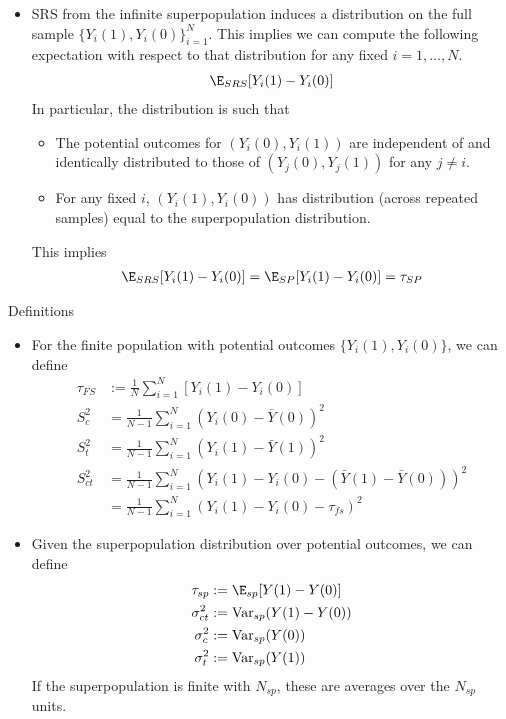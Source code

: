 \documentclass[12pt]{article}
\theoremstyle{plain}
\theoremstyle{definition}
\theoremstyle{remark}
\newcommand{\Var}{\operatorname{Var}}
\newcommand{\sumiN}{\sum^N_{i=1}}
\begin{document}
\begin{itemize}
\begin{itemize}
      \item
        SRS from the infinite superpopulation induces a distribution on
        the full sample $\{Y_i(1),Y_i(0)\}_{i=1}^N$.
        This implies we can compute the following expectation with
        respect to that distribution for any fixed $i=1,\ldots,N$.
        \begin{align*}
          \E_{SRS}[Y_i(1)-Y_i(0)]
        \end{align*}
        In particular, the distribution is such that
        \begin{itemize}
          \item
            The potential outcomes for
            $(Y_i(0),Y_i(1))$
            are independent of and identically distributed to those of
            $(Y_j(0),Y_j(1))$
            for any $j\neq i$.
          \item For any fixed $i$, $(Y_i(1),Y_i(0))$ has distribution
            (across repeated samples) equal to the superpopulation
            distribution.
        \end{itemize}
        This implies
        \begin{align*}
          \E_{SRS}[Y_i(1)-Y_i(0)]
          =
          \E_{SP}[Y_i(1)-Y_i(0)]
          =
          \tau_{SP}
        \end{align*}
    \end{itemize}
\end{itemize}
Definitions
\begin{itemize}
  \item
    For the finite population with potential outcomes
    $\{Y_i(1),Y_i(0)\}$, we can define
    \begin{align*}
      \tau_{FS}
      &:=
      \frac{1}{N}
      \sumiN
      [Y_i(1)-Y_i(0)]
      \\
      S_c^2
      &=
      \frac{1}{N-1}
      \sumiN
      (Y_i(0)-\bar{Y}(0))^2
      \\
      S_t^2
      &=
      \frac{1}{N-1}
      \sumiN
      (Y_i(1)-\bar{Y}(1))^2
      \\
      S_{ct}^2
      &=
      \frac{1}{N-1}
      \sumiN
      (Y_i(1)-Y_i(0)-(\bar{Y}(1)-\bar{Y}(0)))^2
      \\
      &=
      \frac{1}{N-1}
      \sumiN
      (Y_i(1)-Y_i(0)-\tau_{fs})^2
    \end{align*}

  \item
    Given the superpopulation distribution over potential outcomes, we
    can define
    \begin{align*}
      \tau_{sp}
      &:=
      \E_{sp}[Y(1)-Y(0)]
      \\
      \sigma^2_{ct}
      &:=
      \Var_{sp}(Y(1)-Y(0))
      \\
      \sigma^2_{c}
      &:=
      \Var_{sp}(Y(0))
      \\
      \sigma^2_{t}
      &:=
      \Var_{sp}(Y(1))
    \end{align*}
    If the superpopulation is finite with $N_{sp}$, these are averages
    over the $N_{sp}$ units.

\end{itemize}
\end{document}

